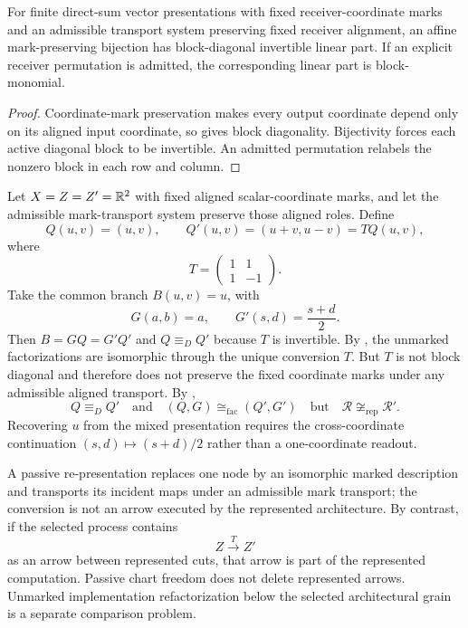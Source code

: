 \begin{corollary}\label{cor:affine-mark-preservation-v13}
For finite direct-sum vector presentations with fixed receiver-coordinate marks and an admissible transport system preserving fixed receiver alignment, an affine mark-preserving bijection has block-diagonal invertible linear part. If an explicit receiver permutation is admitted, the corresponding linear part is block-monomial.
\end{corollary}

\begin{proof}
Coordinate-mark preservation makes every output coordinate depend only on its aligned input coordinate, so  gives block diagonality. Bijectivity forces each active diagonal block to be invertible. An admitted permutation relabels the nonzero block in each row and column.
\end{proof}

\begin{example}\label{ex:affine-presentation-v13}
Let $X=Z=Z'=\mathbb{R}^2$ with fixed aligned scalar-coordinate marks, and let the admissible mark-transport system preserve those aligned roles. Define
\[
Q(u,v)=(u,v),
\qquad
Q'(u,v)=(u+v,u-v)=TQ(u,v),
\]
where
\[
T=\begin{pmatrix}1&1\\1&-1\end{pmatrix}.
\]
Take the common branch $B(u,v)=u$, with
\[
G(a,b)=a,
\qquad
G'(s,d)=\frac{s+d}{2}.
\]
Then $B=GQ=G'Q'$ and $Q\equiv_DQ'$ because $T$ is invertible. By , the unmarked factorizations are isomorphic through the unique conversion $T$. But $T$ is not block diagonal and therefore does not preserve the fixed coordinate marks under any admissible aligned transport. By ,
\[
\boxed{
Q\equiv_DQ'
\quad\text{and}\quad
(Q,G)\cong_{\mathrm{fac}}(Q',G')
\quad\text{but}\quad
\mathcal R\not\cong_{\mathrm{rep}}\mathcal R'.
}
\]
Recovering $u$ from the mixed presentation requires the cross-coordinate continuation $(s,d)\mapsto(s+d)/2$ rather than a one-coordinate readout.
\end{example}

A passive re-presentation replaces one node by an isomorphic marked description and transports its incident maps under an admissible mark transport; the conversion is not an arrow executed by the represented architecture. By contrast, if the selected process contains
\[
Z\xrightarrow{T}Z'
\]
as an arrow between represented cuts, that arrow is part of the represented computation. Passive chart freedom does not delete represented arrows. Unmarked implementation refactorization below the selected architectural grain is a separate comparison problem.
